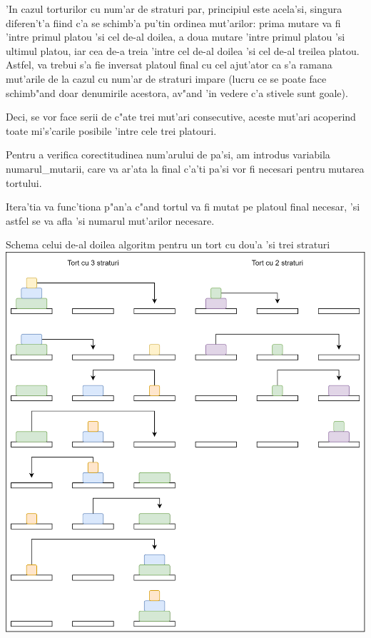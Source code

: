 \documentclass{article}
\begin{document}
'In cazul torturilor cu num'ar de straturi par, principiul este acela'si, singura diferen't'a fiind c'a se schimb'a pu'tin ordinea mut'arilor: prima mutare va fi 'intre primul platou 'si cel de-al doilea, a doua mutare 'intre primul platou 'si ultimul platou, iar cea de-a treia 'intre cel de-al doilea 'si cel de-al treilea platou. Astfel, va trebui s'a fie inversat platoul final cu cel ajut'ator ca s'a ramana mut'arile de la cazul cu num'ar de straturi impare (lucru ce se poate face schimb"and doar denumirile acestora, av"and 'in vedere c'a stivele sunt goale).

Deci, se vor face serii de c"ate trei mut'ari consecutive, aceste mut'ari acoperind toate mi's'carile posibile 'intre cele trei platouri.

Pentru a verifica corectitudinea num'arului de pa'si, am introdus variabila numarul\_mutarii, care va ar'ata la final c'a'ti pa'si vor fi necesari pentru mutarea tortului.

Itera'tia va func'tiona p"an'a c"and tortul va fi mutat pe platoul final necesar, 'si astfel se va afla 'si numarul mut'arilor necesare.
\begin{center}
Schema celui de-al doilea algoritm pentru un tort cu dou'a 'si trei straturi\\
\includegraphics[scale=0.123]{Algoritm_Iterativ}\\
\end{center}
\end{document}
